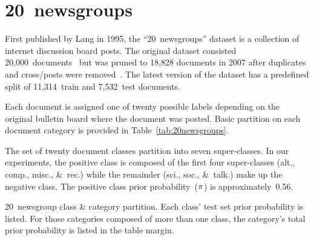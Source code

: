 \section{20~newsgroups}\label{sec:20newsgroups}

First published by Lang in 1995, the ``20~newsgroups'' dataset is a collection of internet discussion board posts.  The original dataset consisted 20,000~documents~\cite{20newsgroups} but was pruned to 18,828 documents in 2007 after duplicates and cross\-/posts were removed~\cite{Rennie:2007}.   The latest version of the dataset has a predefined split of 11,314~train and 7,532~test documents.

Each document is assigned one of twenty possible labels depending on the original bulletin board where the document was posted.  Basic partition on each document category is provided in Table~\ref{tab:20newsgroups}.

The set of twenty document classes partition into seven super-classes.  In our experiments, the positive class is composed of the first four super-classes (alt., comp., misc., \&~rec.) while the remainder (sci., soc., \&~talk.) make up the negative class.  The positive class prior probability~($\pi$) is approximately~0.56.

\begin{table}[t]
  \centering
  \caption{20~newsgroup class \& category partition.  Each class' test set prior probability is listed.  For those categories composed of more than one class, the category's total prior probability is listed in the table margin.}\label{tab:20newsgroups}
  
\end{table}

